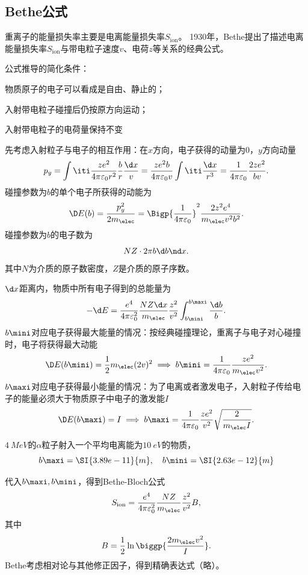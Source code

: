 \subsection{Bethe公式}

重离子的能量损失率主要是电离能量损失率$S_{\mathrm{ion}}$。
1930年，Bethe提出了描述电离能量损失率$S_{\mathrm{ion}}$与带电粒子速度$v$、电荷$z$等关系的经典公式。

公式推导的简化条件：
\begin{compactenum}
	\item 物质原子的电子可以看成是自由、静止的；
	\item 入射带电粒子碰撞后仍按原方向运动；
	\item 入射带电粒子的电荷量保持不变
\end{compactenum}

先考虑入射粒子与电子的相互作用：在$x$方向，电子获得的动量为0，$y$方向动量 
\[
	p_y=\int\iti\frac{ze^2}{4\pi\varepsilon_0r^2}\frac br\frac{\d x}v=\frac{ze^2b}{4\pi\varepsilon_0v}\int\iti\frac{\d x}{r^3}=\frac1{4\pi\varepsilon_0}\frac{2ze^2}{bv}.
\]
碰撞参数为$b$的单个电子所获得的动能为
\[
	\D E(b)=\frac{p_y^2}{2m_\elec}=\Bigp{\frac1{4\pi\varepsilon_0}}^2\frac{2z^2e^4}{m_\elec v^2b^2}.
\]
碰撞参数为$b$的电子数为
\[
	NZ\cdot 2\pi b\d b\nd x.
\]
其中$N$为介质的原子数密度，$Z$是介质的原子序数。

$\d x$距离内，物质中所有电子得到的总能量为
\[
	-\d E=\frac{e^4}{4\pi\varepsilon_0^2}\frac{NZ\d x}{m_\elec}\frac{z^2}{v^2}\int_{b\mini}^{b\maxi}\frac{\d b}b.
\]
$b\mini$对应电子获得最大能量的情况：按经典碰撞理论，重离子与电子对心碰撞时，电子将获得最大动能
\[
	\D E(b\mini)=\frac12m_\elec(2v)^2\implies b\mini=\frac1{4\pi\varepsilon_0}\frac{ze^2}{m_\elec v^2}.
\]
$b\maxi$对应电子获得最小能量的情况：为了电离或者激发电子，入射粒子传给电子的能量必须大于物质原子中电子的激发能$I$
\[
	\D E(b\maxi)=I\implies b\maxi=\frac1{4\pi\varepsilon_0}\frac{ze^2}{v^2}\sqrt{\frac2{m_\elec I}}.
\]
\begin{example}{}{}
	$\SI{4}{MeV}$的$\alpha$粒子射入一个平均电离能为$\SI{10}{eV}$的物质，
	\[
		b\maxi=\SI{3.89e-11}{m},\quad b\mini=\SI{2.63e-12}{m}
	\]
\end{example}

代入$b\maxi,b\mini$，得到Bethe-Bloch公式
\begin{align}\label{Bethe-formula}
	S_{\mathrm{ion}}=\frac{e^4}{4\pi\varepsilon_0^2}\frac{NZ}{m_\elec}\frac{z^2}{v^2}B,
\end{align}
其中 
\[
	B=\frac12\ln\biggp{\frac{2m_\elec v^2}I}.
\]
Bethe考虑相对论与其他修正因子，得到精确表达式（略）。


